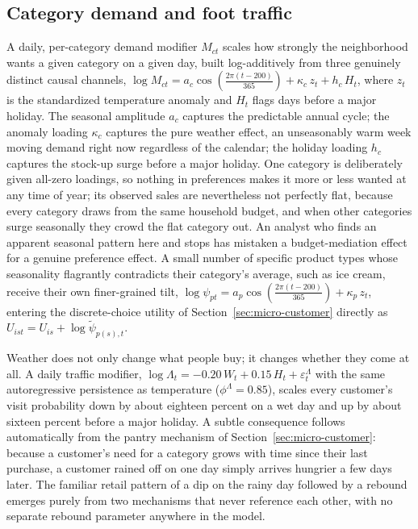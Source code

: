 \documentclass[12pt,a4paper]{article}
\begin{document}
\subsection{Category demand and foot traffic}

A daily, per-category demand modifier $M_{ct}$ scales how strongly the
neighborhood wants a given category on a given day, built log-additively
from three genuinely distinct causal channels, $\log M_{ct} = a_c
\cos\!\left(\tfrac{2\pi(t-200)}{365}\right) + \kappa_c\, z_t + h_c\, H_t$,
where $z_t$ is the standardized temperature anomaly and $H_t$ flags days
before a major holiday. The seasonal amplitude $a_c$ captures the
predictable annual cycle; the anomaly loading $\kappa_c$ captures the
pure weather effect, an unseasonably warm week moving demand right now
regardless of the calendar; the holiday loading $h_c$ captures the
stock-up surge before a major holiday. One category is deliberately
given all-zero loadings, so nothing in preferences makes it more or less
wanted at any time of year; its observed sales are nevertheless not
perfectly flat, because every category draws from the same household
budget, and when other categories surge seasonally they crowd the flat
category out. An analyst who finds an apparent seasonal pattern here and
stops has mistaken a budget-mediation effect for a genuine preference
effect. A small number of specific product types whose seasonality
flagrantly contradicts their category's average, such as ice cream,
receive their own finer-grained tilt, $\log \psi_{pt} = a_p
\cos\!\left(\tfrac{2\pi(t-200)}{365}\right) + \kappa_p\, z_t$, entering
the discrete-choice utility of Section~\ref{sec:micro-customer} directly
as $U_{ist} = U_{is} + \log\tilde{\psi}_{p(s),t}$.

Weather does not only change what people buy; it changes whether they
come at all. A daily traffic modifier, $\log \Lambda_t = -0.20\,W_t +
0.15\,H_t + \varepsilon^{\Lambda}_t$ with the same autoregressive
persistence as temperature ($\phi^\Lambda = 0.85$), scales every
customer's visit probability down by about eighteen percent on a wet
day and up by about sixteen percent before a major holiday. A subtle
consequence follows automatically from the pantry mechanism of
Section~\ref{sec:micro-customer}: because a customer's need for a
category grows with time since their last purchase, a customer rained
off on one day simply arrives hungrier a few days later. The familiar
retail pattern of a dip on the rainy day followed by a rebound emerges
purely from two mechanisms that never reference each other, with no
separate rebound parameter anywhere in the model.
\end{document}
